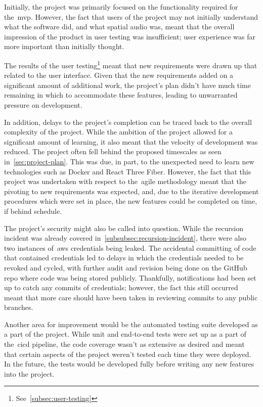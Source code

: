 Initially, the project was primarily focused on the functionality required for the~\gls{mvp}.
However, the fact that users of the project may not initially understand what the software did,
and what spatial audio was, meant that the overall impression of the product in user testing was insufficient;
user experience was far more important than initially thought.

The results of the user testing\footnote{See~\ref{subsec:user-testing}} meant
that new requirements were drawn up that related to the user interface.
Given that the new requirements added on a significant amount of additional work,
the project's plan didn't have much time remaining in which to accommodate these features,
leading to unwarranted pressure on development.

In addition, delays to the project's completion can be traced back to the overall complexity of the project.
While the ambition of the project allowed for a significant amount of learning,
it also meant that the velocity of development was reduced.
The project often fell behind the proposed timescales as seen in~\ref{sec:project-plan}.
This was due, in part, to the unexpected need to learn new technologies such as Docker and React Three Fiber.
However,
the fact that this project was undertaken with respect to the~\gls{agile} methodology meant
that the pivoting to new requirements was expected, and,
due to the iterative development procedures which were set in place,
the new features could be completed on time, if behind schedule.

The project's security might also be called into question.
While the recursion incident was already covered in~\ref{subsubsec:recursion-incident},
there were also two instances of~\gls{aws} credentials being leaked.
The accidental committing of code that contained credentials led to delays
in which the credentials needed to be revoked and cycled,
with further audit and revision being done on the GitHub repo where code was being stored publicly.
Thankfully, notifications had been set up to catch any commits of credentials;
however, the fact this still occurred meant
that more care should have been taken in reviewing commits to any public branches.

Another area for improvement would be the automated testing suite developed as a part of the project.
While unit and end-to-end tests were set up as a part of the~\gls{cicd} pipeline,
the code coverage wasn't as extensive as desired
and meant that certain aspects of the project weren't tested each time they were deployed.
In the future, the tests would be developed fully before writing any new features into the project.

